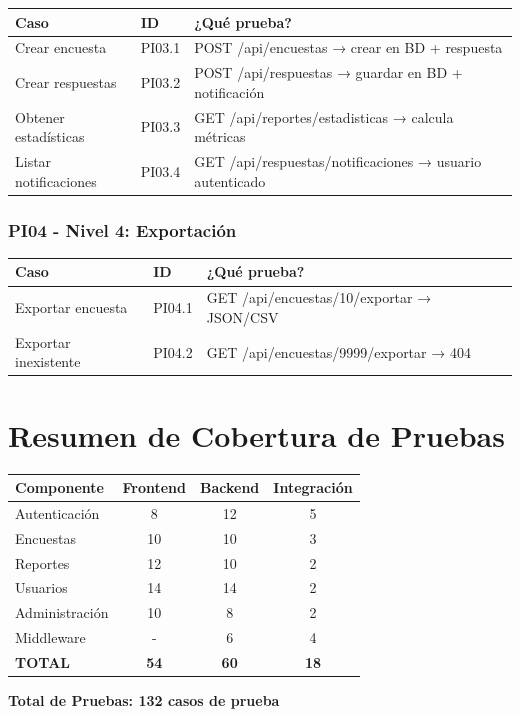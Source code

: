 \begin{table}[H]
\centering
\begin{tabular}{|l|l|p{6cm}|}
\hline
\textbf{Caso} & \textbf{ID} & \textbf{¿Qué prueba?} \\ \hline
Crear encuesta & PI03.1 & POST /api/encuestas → crear en BD + respuesta \\ \hline
Crear respuestas & PI03.2 & POST /api/respuestas → guardar en BD + notificación \\ \hline
Obtener estadísticas & PI03.3 & GET /api/reportes/estadisticas → calcula métricas \\ \hline
Listar notificaciones & PI03.4 & GET /api/respuestas/notificaciones → usuario autenticado \\ \hline
\end{tabular}
\end{table}

\subsubsection{PI04 - Nivel 4: Exportación}

\begin{table}[H]
\centering
\begin{tabular}{|l|l|p{6cm}|}
\hline
\textbf{Caso} & \textbf{ID} & \textbf{¿Qué prueba?} \\ \hline
Exportar encuesta & PI04.1 & GET /api/encuestas/10/exportar → JSON/CSV \\ \hline
Exportar inexistente & PI04.2 & GET /api/encuestas/9999/exportar → 404 \\ \hline
\end{tabular}
\end{table}

\section{Resumen de Cobertura de Pruebas}

\begin{table}[H]
\centering
\begin{tabular}{|l|c|c|c|}
\hline
\textbf{Componente} & \textbf{Frontend} & \textbf{Backend} & \textbf{Integración} \\ \hline
Autenticación & 8 & 12 & 5 \\ \hline
Encuestas & 10 & 10 & 3 \\ \hline
Reportes & 12 & 10 & 2 \\ \hline
Usuarios & 14 & 14 & 2 \\ \hline
Administración & 10 & 8 & 2 \\ \hline
Middleware & - & 6 & 4 \\ \hline
\textbf{TOTAL} & \textbf{54} & \textbf{60} & \textbf{18} \\ \hline
\end{tabular}
\end{table}

\textbf{Total de Pruebas: 132 casos de prueba}
